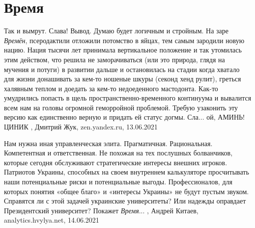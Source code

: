  
 
 
 
 
\chapter{Время}
\label{sec:slova.vremja}

Так и вымрут. Слава!  Вывод. Думаю будет логичным и стройным. На заре
\emph{Времён}, псеродактили отложили потомство в яйцах, тем самым зародили
новую нацию. Нация тысячи лет принимала вертикальное положение и так утомилась
этим действом, что решила не заморачиваться (или это природа, глядя на мучения
и потуги) в развитии дальше и остановилась на стадии когда хватало для жизни
донашивать за кем-то ношеные шкуры (секонд хенд рулит), греться халявным теплом
и доедать за кем-то недоеденного мастодонта. Как-то умудрились попасть в щель
пространственно-временного континуума и вывалится всем нам на головы огромной
геморройной проблемой. Требую узаконить эту версию как единственно верную и
придать ей статус догмы. Сла... ой, АМИНЬ! ЦИНИК
, 
Дмитрий Жук, zen.yandex.ru, 13.06.2021 

Нам нужна иная управленческая элита. Прагматичная. Рациональная. Компетентная и
ответственная. Не похожая на тех послушных болванчиков, которые сегодня
обслуживают стратегические интересы внешних игроков. Патриотов Украины,
способных на своем внутреннем калькуляторе просчитывать наши потенциальные
риски и потенциальные выгоды. Профессионалов, для которых понятия «общее благо»
и «интересы Украины» не будут пустым звуком. Справятся ли с этой задачей
украинские университеты? Или надежды оправдает Президентский университет?
Покажет \emph{Время}...
, Андрей Китаев, 
analytics.hvylya.net, 14.06.2021


